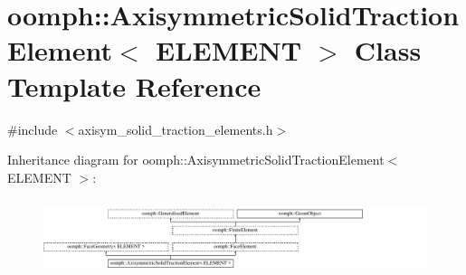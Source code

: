 \hypertarget{classoomph_1_1AxisymmetricSolidTractionElement}{}\section{oomph\+:\+:Axisymmetric\+Solid\+Traction\+Element$<$ E\+L\+E\+M\+E\+NT $>$ Class Template Reference}
\label{classoomph_1_1AxisymmetricSolidTractionElement}


{\ttfamily \#include $<$axisym\+\_\+solid\+\_\+traction\+\_\+elements.\+h$>$}

Inheritance diagram for oomph\+:\+:Axisymmetric\+Solid\+Traction\+Element$<$ E\+L\+E\+M\+E\+NT $>$\+:\begin{figure}[H]
\begin{center}
\leavevmode
\includegraphics[height=2.215628cm]{classoomph_1_1AxisymmetricSolidTractionElement}
\end{center}
\end{figure}
